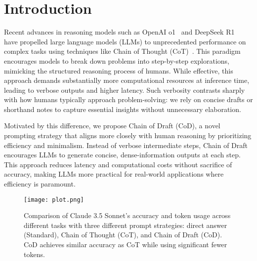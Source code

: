 

\section{Introduction}
Recent advances in reasoning models such as OpenAI o1~\cite{o1} and DeepSeek R1~\cite{r1} have propelled large language models (LLMs) to unprecedented performance on complex tasks using techniques like Chain of Thought (CoT)~\cite{cot}.
This paradigm encourages models to break down problems into step-by-step explorations, mimicking the structured reasoning process of humans. 
While effective, this approach demands substantially more computational resources at inference time, leading to verbose outputs and higher latency. 
Such verbosity contrasts sharply with how humans typically approach problem-solving: we rely on concise drafts or shorthand notes to capture essential insights without unnecessary elaboration.

Motivated by this difference, we propose Chain of Draft (CoD), a novel prompting strategy that aligns more closely with human reasoning by prioritizing efficiency and minimalism. Instead of verbose intermediate steps, Chain of Draft encourages LLMs to generate concise, dense-information outputs at each step. This approach reduces latency and computational costs without sacrifice of accuracy, making LLMs more practical for real-world applications where efficiency is paramount.

\begin{figure}[t]
    \vspace{-1.5em}
    \centering
    \texttt{[image: plot.png]}
    \caption{Comparison of Claude 3.5 Sonnet's accuracy and token usage across different tasks with three different prompt strategies: direct answer (Standard), Chain of Thought (CoT), and Chain of Draft (CoD). CoD achieves similar accuracy as CoT while using significant fewer tokens.}
    \label{fig:plot}
\end{figure}

